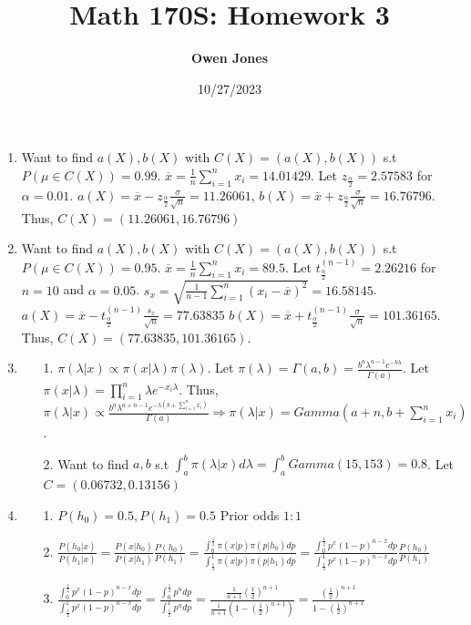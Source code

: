 \documentclass[10pt]{article}
\title{\bf Math 170S: Homework 3}
\date{10/27/2023}
\author{\bf Owen Jones}
\begin{document}
\maketitle
\begin{enumerate}[label=\textbf{Problem \arabic*.}]
\item Want to find $a(X),b(X)$ with $C(X)=(a(X),b(X))$ s.t $P(\mu\in C(X))=0.99$. 
$\overline{x}=\frac{1}{n}\sum_{i=1}^{n}x_i=14.01429$.
Let $z_{\frac{\alpha}{2}}=2.57583$ for $\alpha=0.01$.
$a(X)=\overline{x}-z_{\frac{\alpha}{2}}\frac{\sigma}{\sqrt{n}}=11.26061$, 
$b(X)=\overline{x}+z_{\frac{\alpha}{2}}\frac{\sigma}{\sqrt{n}}=16.76796$.
Thus, $C(X)=(11.26061,16.76796)$
\item Want to find $a(X),b(X)$ with $C(X)=(a(X),b(X))$ s.t $P(\mu\in C(X))=0.95$. 
$\overline{x}=\frac{1}{n}\sum_{i=1}^{n}x_i=89.5$.
Let $t_{\frac{\alpha}{2}}^{(n-1)}=2.26216$ for $n=10$ and $\alpha=0.05$. $s_x=\sqrt{\frac{1}{n-1}\sum_{i=1}^{n}{(x_i-\overline{x})}^2}=16.58145$. 
$a(X)=\overline{x}-t_{\frac{\alpha}{2}}^{(n-1)}\frac{s_x}{\sqrt{n}}=77.63835$
$b(X)=\overline{x}+t_{\frac{\alpha}{2}}^{(n-1)}\frac{\sigma}{\sqrt{n}}=101.36165$.
Thus, $C(X)=(77.63835,101.36165)$.
\item \begin{itemize}
    \item [1.] $\pi(\lambda|x)\propto\pi(x|\lambda)\pi(\lambda)$. 
    Let $\pi(\lambda)=\Gamma(a,b)=\frac{b^a \lambda^{a-1}e^{-b\lambda}}{\Gamma(a)}$. 
    Let $\displaystyle\pi(x|\lambda)=\prod_{i=1}^{n} \lambda e^{-x_i\lambda}$.
    Thus, $\pi(\lambda|x)\propto \frac{b^a\lambda^{a+n-1}e^{-\lambda(b+\sum_{i=1}^{n}x_i)}}{\Gamma(a)}\Rightarrow\pi(\lambda|x)=Gamma(a+n,b+\sum_{i=1}^{n}x_i)$.
    \item [2.] Want to find $a,b$ s.t $\int_{a}^{b}\pi(\lambda|x)d\lambda=\int_{a}^{b}Gamma(15,153)=0.8$. Let $C=(0.06732,0.13156)$
\end{itemize}
\item \begin{itemize}
    \item [1.] $P(h_0)=0.5,P(h_1)=0.5$ Prior odds $1:1$
    \item [2.] $\frac{P(h_0|x)}{P(h_1|x)}=\frac{P(x|h_0)}{P(x|h_1)}\frac{P(h_0)}{P(h_1)}=\frac{\int_{0}^{\frac{1}{2}}\pi(x|p)\pi(p|h_0)dp}{\int_{\frac{1}{2}}^{1}\pi(x|p)\pi(p|h_1)dp}=\frac{\int_{0}^{\frac{1}{2}}p^x{(1-p)}^{n-x}dp}{\int_{\frac{1}{2}}^{1}p^x{(1-p)}^{n-x}dp}\frac{P(h_0)}{P(h_1)}$
    \item [3.] $\frac{\int_{0}^{\frac{1}{2}}p^x{(1-p)}^{n-x}dp}{\int_{\frac{1}{2}}^{1}p^x{(1-p)}^{n-x}dp}=\frac{\int_{0}^{\frac{1}{2}}p^{n}dp}{\int_{\frac{1}{2}}^{1}p^{n}dp}=\frac{\frac{1}{n+1}{(\frac{1}{2})}^{n+1}}{\frac{1}{n+1}(1-{(\frac{1}{2})}^{n+1})}=\frac{{(\frac{1}{2})}^{n+1}}{1-{(\frac{1}{2})}^{n+1}}$

\end{itemize}
\end{enumerate}
\end{document}
